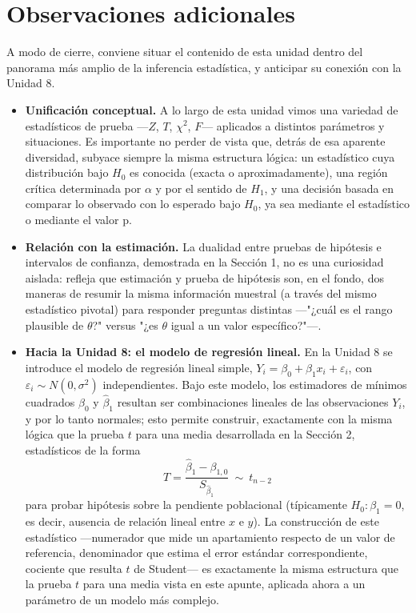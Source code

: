 \documentclass[11pt,a4paper]{article}
\theoremstyle{plain}
\theoremstyle{definition}
\theoremstyle{remark}
\begin{document}
\newpage
\section{Observaciones adicionales}

A modo de cierre, conviene situar el contenido de esta unidad dentro del panorama más amplio de la inferencia estadística, y anticipar su conexión con la Unidad 8.

\begin{itemize}[nosep]
\item \textbf{Unificación conceptual.} A lo largo de esta unidad vimos una variedad de estadísticos de prueba —$Z$, $T$, $\chi^2$, $F$— aplicados a distintos parámetros y situaciones. Es importante no perder de vista que, detrás de esa aparente diversidad, subyace siempre la misma estructura lógica: un estadístico cuya distribución bajo $H_0$ es conocida (exacta o aproximadamente), una región crítica determinada por $\alpha$ y por el sentido de $H_1$, y una decisión basada en comparar lo observado con lo esperado bajo $H_0$, ya sea mediante el estadístico o mediante el valor p.
\item \textbf{Relación con la estimación.} La dualidad entre pruebas de hipótesis e intervalos de confianza, demostrada en la Sección 1, no es una curiosidad aislada: refleja que estimación y prueba de hipótesis son, en el fondo, dos maneras de resumir la misma información muestral (a través del mismo estadístico pivotal) para responder preguntas distintas —"¿cuál es el rango plausible de $\theta$?" versus "¿es $\theta$ igual a un valor específico?"—.
\item \textbf{Hacia la Unidad 8: el modelo de regresión lineal.} En la Unidad 8 se introduce el modelo de regresión lineal simple, $Y_i=\beta_0+\beta_1 x_i+\varepsilon_i$, con $\varepsilon_i\sim N(0,\sigma^2)$ independientes. Bajo este modelo, los estimadores de mínimos cuadrados $\hat\beta_0$ y $\hat\beta_1$ resultan ser combinaciones lineales de las observaciones $Y_i$, y por lo tanto normales; esto permite construir, exactamente con la misma lógica que la prueba $t$ para una media desarrollada en la Sección 2, estadísticos de la forma
\[
T=\frac{\hat\beta_1-\beta_{1,0}}{S_{\hat\beta_1}}\ \sim\ t_{n-2}
\]
para probar hipótesis sobre la pendiente poblacional (típicamente $H_0:\beta_1=0$, es decir, ausencia de relación lineal entre $x$ e $y$). La construcción de este estadístico —numerador que mide un apartamiento respecto de un valor de referencia, denominador que estima el error estándar correspondiente, cociente que resulta $t$ de Student— es exactamente la misma estructura que la prueba $t$ para una media vista en este apunte, aplicada ahora a un parámetro de un modelo más complejo.

\end{itemize}
\end{document}
